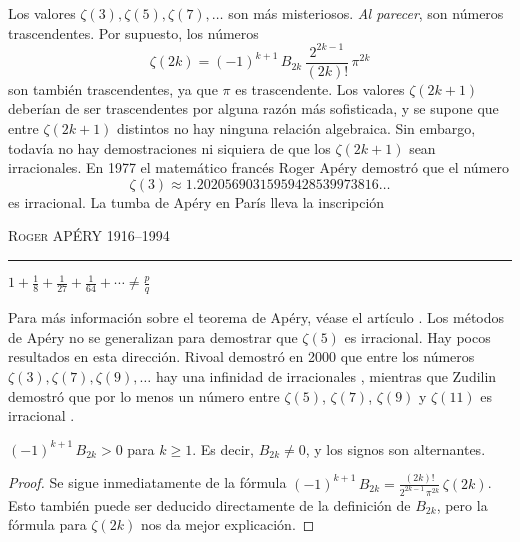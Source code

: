 \begin{comentario}
  Los valores $\zeta (3), \zeta (5), \zeta (7), \ldots$ son más misteriosos.
  \emph{Al parecer}, son números trascendentes. Por supuesto, los números
  $$\zeta (2k) = (-1)^{k+1} \, B_{2k}\,\frac{2^{2k-1}}{(2k)!}\,\pi^{2k}$$
  son también trascendentes, ya que $\pi$ es trascendente. Los valores $\zeta
  (2k+1)$ deberían de ser trascendentes por alguna razón más sofisticada, y se
  supone que entre $\zeta (2k+1)$ distintos no hay ninguna relación algebraica.
  Sin embargo, todavía no hay demostraciones ni siquiera de que los $\zeta
  (2k+1)$ sean irracionales. En 1977 el matemático francés Roger Apéry demostró
  que el número
  $$\zeta (3) \approx 1.20205690315959428539973816\ldots$$
  es irracional. La tumba de Apéry en París lleva la inscripción
  \begin{center}
    \noindent\textsc{Roger APÉRY}
    \noindent\textsc{1916--1994}

    \vspace{0.7em}

    \noindent\rule{1cm}{0.4mm}

    \vspace{1em}

    \noindent$1 + \frac{1}{8} + \frac{1}{27} + \frac{1}{64} + \cdots \ne \frac{p}{q}$
  \end{center}
  \noindent Para más información sobre el teorema de Apéry, véase el artículo
  \cite{van-der-Poorten-1978}.
  Los métodos de Apéry no se generalizan para demostrar que $\zeta (5)$ es
  irracional. Hay pocos resultados en esta dirección. Rivoal demostró en 2000
  que entre los números $\zeta (3), \zeta (7), \zeta (9), \ldots$ hay una
  infinidad de irracionales \cite{Rivoal-2000}, mientras que Zudilin demostró
  que por lo menos un número entre $\zeta(5)$, $\zeta(7)$, $\zeta(9)$ y
  $\zeta(11)$ es irracional \cite{Zudilin-2004}.
\end{comentario}

\begin{corolario}
  $(-1)^{k+1}\,B_{2k} > 0$ para $k \ge 1$. Es decir, $B_{2k} \ne 0$, y los
  signos son alternantes.

  \begin{proof}
    Se sigue inmediatamente de la fórmula
    $(-1)^{k+1}\, B_{2k} = \frac{(2k)!}{2^{2k-1}\,\pi^{2k}} \, \zeta (2k)$.
    Esto también puede ser deducido directamente de la definición de $B_{2k}$,
    pero la fórmula para $\zeta (2k)$ nos da mejor explicación.
  \end{proof}
\end{corolario}

